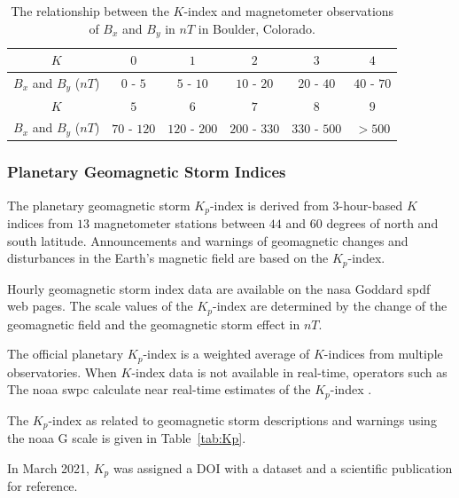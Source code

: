 \documentclass[sn-mathphys-num]{sn-jnl}%
\begin{document}
\begin{table}[!ht]
    \centering
    \caption{The relationship between the $K$-index and  magnetometer observations of $B_{x}$ and $B_{y}$ in $nT$ in Boulder, Colorado.}
    \label{tab:K}
    \begin{tabular}{|c|c|c|c|c|c|}
        \hline
        $K$ & $0$ & $1$ & $2$ & $3$ & $4$ \\ \hline
        $B_{x}$ and $B_{y}$ ($nT$)& $0$ - $5$ & $5$ - $10$ & $10$ - $20$ & $20$ - $40$ & $40$ - $70$ \\ \hline
        $K$ & $5$ & $6$ & $7$ & $8$ & $9$ \\ \hline
        $B_{x}$ and $B_{y}$ ($nT$) & $70$ - $120$ & $120$ - $200$ & $200$ - $330$ & $330$ - $500$ & $>500$ \\ \hline
    \end{tabular}
\end{table}

\subsubsection{Planetary Geomagnetic Storm Indices}

The planetary geomagnetic storm $K_{p}$-index \cite{Matzka2024} is derived from $3$-hour-based $K$ indices from $13$ magnetometer stations between $44$ and $60$ degrees of north and south latitude. Announcements and warnings \cite{NOAA2024cAlertsWatches} of geomagnetic changes and disturbances in the Earth's magnetic field are based on the $K_{p}$-index.

Hourly geomagnetic storm index data are available on the \acrshort{nasa} Goddard \acrshort{spdf} \cite{Papitashvili2024About, Papitashvili2024Explorer} web pages. The scale values of the $K_{p}$-index are determined by the change of the geomagnetic field and the geomagnetic storm effect in $nT$.

The official planetary $K_{p}$-index is a weighted average of $K$-indices from multiple observatories. When $K$-index data is not available in real-time, operators such as The \acrfull{noaa} \acrfull{swpc} calculate near real-time estimates of the $K_{p}$-index \cite{Myint2022}.

The $K_{p}$-index as related to geomagnetic storm descriptions and warnings using the \acrshort{noaa} G scale \cite{NOAA2024eSpace, NOAA2024fScales} is given in Table~\ref{tab:Kp}.

In March 2021, $K_{p}$ was assigned a DOI with a dataset \cite{Matzka2021a} and a scientific publication \cite{Matzka2021b} for reference.
\end{document}
